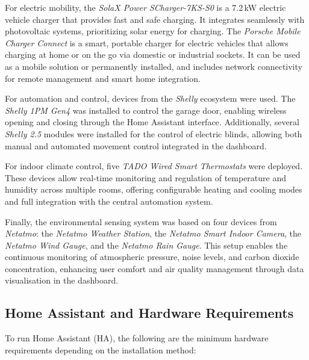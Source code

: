 \documentclass[graybox]{svmult}
\begin{document}
For electric mobility, the \textit{SolaX Power SCharger-7KS-S0} is a 7.2\,kW electric vehicle charger that provides fast and safe charging. It integrates seamlessly with photovoltaic systems, prioritizing solar energy for charging. The \textit{Porsche Mobile Charger Connect} is a smart, portable charger for electric vehicles that allows charging at home or on the go via domestic or industrial sockets. It can be used as a mobile solution or permanently installed, and includes network connectivity for remote management and smart home integration.

For automation and control, devices from the \textit{Shelly} ecosystem were used. The \textit{Shelly 1PM Gen4} was installed to control the garage door, enabling wireless opening and closing through the Home Assistant interface. Additionally, several \textit{Shelly 2.5} modules were installed for the control of electric blinds, allowing both manual and automated movement control integrated in the dashboard.

For indoor climate control, five \textit{TADO Wired Smart Thermostats} were deployed. These devices allow real-time monitoring and regulation of temperature and humidity across multiple rooms, offering configurable heating and cooling modes and full integration with the central automation system.

Finally, the environmental sensing system was based on four devices from \textit{Netatmo}: the \textit{Netatmo Weather Station}, the \textit{Netatmo Smart Indoor Camera}, the \textit{Netatmo Wind Gauge}, and the \textit{Netatmo Rain Gauge}. This setup enables the continuous monitoring of atmospheric pressure, noise levels, and carbon dioxide concentration, enhancing user comfort and air quality management through data visualisation in the dashboard.


\subsection{Home Assistant and Hardware Requirements}

To run Home Assistant (HA), the following are the minimum hardware requirements depending on the installation method:
\end{document}
